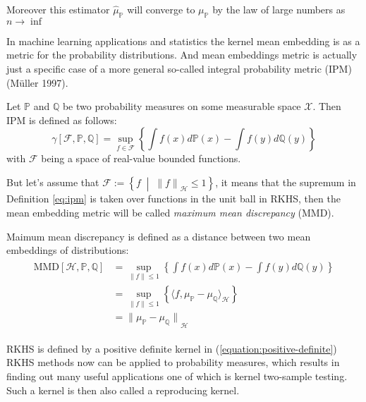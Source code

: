 Moreover this estimator $\hat{\mu}_{\mathds{P}}$  will converge to $\mu_{\mathds{P}}$ by the law of large numbers as $n \rightarrow \inf$

In machine learning applications and statistics the kernel mean embedding is as a metric for the probability distributions. And mean embeddings metric is actually just a specific case of a more general so-called integral probability metric (IPM) (Müller 1997). 

\begin{definition}[IPM]
    Let $\mathds{P}$ and  $\mathds{Q}$ be two probability measures on some measurable space $\mathcal{X}$. Then IPM is defined as follows:
    \begin{equation}
        \gamma [\mathcal{F}, \mathds{P}, \mathds{Q}] = \sup_{f\in \mathcal{F}} \left\{ \int f(x) d\mathds{P}(x) -  \int f(y) d\mathds{Q}(y) \right\}
    \end{equation}
    with $\mathcal{F}$ being a space of real-value bounded functions.
    \label{eq:ipm}
\end{definition}

But let's assume that $\mathcal{F} := \left\{f \;\middle| \;{\lVert f \rVert}_{\mathscr{H}} \leq 1\right\}$, it means that the supremum in Definition \ref{eq:ipm} is taken over functions in the unit ball in RKHS, then the mean embedding metric will be called \textit{maximum mean discrepancy} (MMD). 

\begin{definition}[IPM]
    Maimum mean discrepancy is defined as a distance between two mean embeddings of distributions:
    \begin{align}
        \begin{split}
            \textrm{MMD} [\mathscr{H}, \mathds{P}, \mathds{Q}] & = \sup_{ \lVert f \rVert \leq 1} \left\{ \int f(x) d\mathds{P}(x) -  \int f(y) d\mathds{Q}(y) \right\} \\ 
            & = \sup_{ \lVert f \rVert \leq 1} \left\{ \langle f, \mu_{\mathds{P}} - \mu_{\mathds{Q}} \rangle_{\mathscr{H}} \right\} \\
            & = {\lVert \mu_{\mathds{P}} - \mu_{\mathds{Q}} \rVert }_{\mathscr{H}}
        \end{split}
    \end{align}
    \label{eq:mmd}
\end{definition}




RKHS is defined by a positive definite kernel in (\ref{equation:positive-definite})
RKHS methods now can be applied to probability measures, which results in finding out many useful applications one of which is kernel two-sample testing. Such a kernel is then also called a reproducing kernel. 